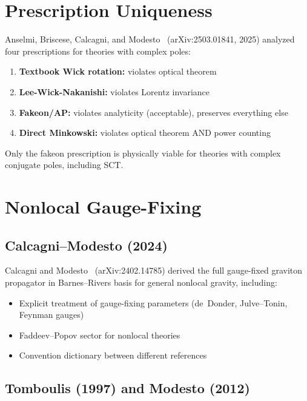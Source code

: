 \documentclass[11pt,a4paper]{article}
\theoremstyle{remark}
\begin{document}
\section{Prescription Uniqueness}

Anselmi, Briscese, Calcagni, and Modesto~\cite{ABCM2025}
(arXiv:2503.01841, 2025) analyzed four prescriptions for theories
with complex poles:
\begin{enumerate}
  \item \textbf{Textbook Wick rotation:} violates optical theorem
  \item \textbf{Lee-Wick-Nakanishi:} violates Lorentz invariance
  \item \textbf{Fakeon/AP:} violates analyticity (acceptable), preserves
        everything else
  \item \textbf{Direct Minkowski:} violates optical theorem AND power
        counting
\end{enumerate}

Only the fakeon prescription is physically viable for theories with
complex conjugate poles, including SCT.

\section{Nonlocal Gauge-Fixing}

\subsection{Calcagni--Modesto (2024)}

Calcagni and Modesto~\cite{CalcagniModesto2024}
(arXiv:2402.14785) derived the full gauge-fixed graviton propagator
in Barnes--Rivers basis for general nonlocal gravity, including:
\begin{itemize}
  \item Explicit treatment of gauge-fixing parameters (de~Donder,
        Julve--Tonin, Feynman gauges)
  \item Faddeev--Popov sector for nonlocal theories
  \item Convention dictionary between different references
\end{itemize}

\subsection{Tomboulis (1997) and Modesto (2012)}
\end{document}
